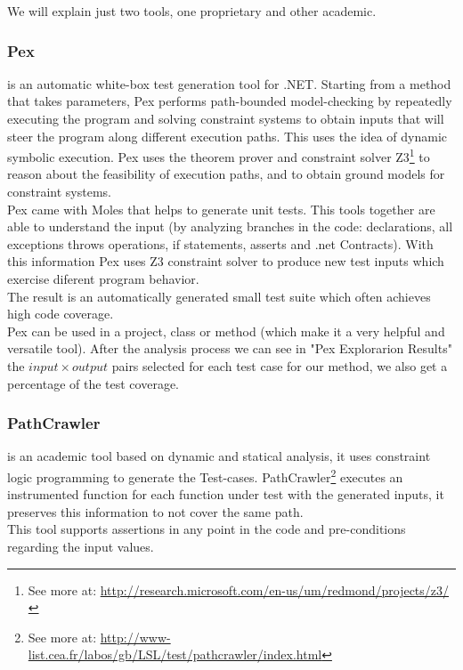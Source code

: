 \documentclass[10pt, conference, compsocconf]{IEEEtran}
\begin{document}
We will explain just two tools, one proprietary and other academic.

\subsubsection{\textbf{Pex}\cite{Tillmann:2008:PWB:1792786.1792798}} is an automatic white-box test generation tool for .NET. Starting from a
method that takes parameters, Pex performs path-bounded model-checking
by repeatedly executing the program and solving constraint systems to obtain inputs that will steer the program along different execution paths.
This uses the idea of dynamic symbolic execution\cite{Tillmann06unittests}. Pex uses the theorem prover and
constraint solver Z3\footnote{See more at: \url{http://research.microsoft.com/en-us/um/redmond/projects/z3/}} to reason about the feasibility of execution paths, and
to obtain ground models for constraint systems.\\
Pex came with Moles that helps to generate unit tests. This tools together are able to understand the input (by analyzing branches in the code:
declarations, all exceptions throws operations, if statements, asserts and .net Contracts). With this information Pex uses Z3 constraint solver to
produce new test inputs which exercise diferent program behavior.\\
The result is an automatically generated small test suite which often achieves high code coverage.\\
Pex can be used in a project, class or method (which make it a very helpful and versatile tool). After the analysis process we can see in "Pex Explorarion Results"
the $input \times output$ pairs selected for each test case for our method, we also get a percentage of the test coverage.

\subsubsection{\textbf{PathCrawler}\cite{Williams05pathcrawler:automatic}} is an academic tool based on dynamic and statical analysis, 
it uses constraint logic programming to generate the Test-cases. PathCrawler\footnote{See more at: \url{http://www-list.cea.fr/labos/gb/LSL/test/pathcrawler/index.html}} executes an instrumented function for each function under test
with the generated inputs, it preserves this information to not cover the same path.\\
This tool supports assertions in any point in the code and pre-conditions regarding the input values.
\end{document}
